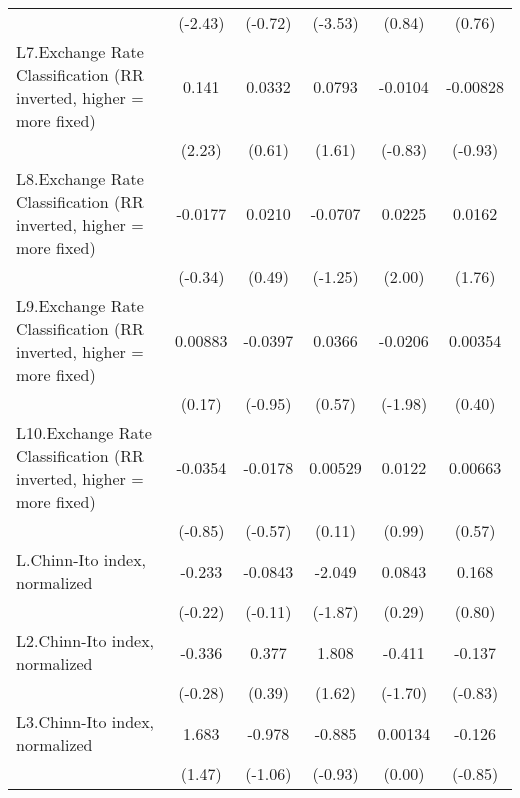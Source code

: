 {\begin{longtable}{l*{5}{c}}
                &  (-2.43)         &  (-0.72)         &  (-3.53)         &   (0.84)         &   (0.76)         \\
[1em]
L7.Exchange Rate Classification (RR inverted, higher = more fixed)&    0.141\sym{*}  &   0.0332         &   0.0793         &  -0.0104         & -0.00828         \\
                &   (2.23)         &   (0.61)         &   (1.61)         &  (-0.83)         &  (-0.93)         \\
[1em]
L8.Exchange Rate Classification (RR inverted, higher = more fixed)&  -0.0177         &   0.0210         &  -0.0707         &   0.0225\sym{*}  &   0.0162         \\
                &  (-0.34)         &   (0.49)         &  (-1.25)         &   (2.00)         &   (1.76)         \\
[1em]
L9.Exchange Rate Classification (RR inverted, higher = more fixed)&  0.00883         &  -0.0397         &   0.0366         &  -0.0206\sym{*}  &  0.00354         \\
                &   (0.17)         &  (-0.95)         &   (0.57)         &  (-1.98)         &   (0.40)         \\
[1em]
L10.Exchange Rate Classification (RR inverted, higher = more fixed)&  -0.0354         &  -0.0178         &  0.00529         &   0.0122         &  0.00663         \\
                &  (-0.85)         &  (-0.57)         &   (0.11)         &   (0.99)         &   (0.57)         \\
[1em]
L.Chinn-Ito index, normalized&   -0.233         &  -0.0843         &   -2.049         &   0.0843         &    0.168         \\
                &  (-0.22)         &  (-0.11)         &  (-1.87)         &   (0.29)         &   (0.80)         \\
[1em]
L2.Chinn-Ito index, normalized&   -0.336         &    0.377         &    1.808         &   -0.411         &   -0.137         \\
                &  (-0.28)         &   (0.39)         &   (1.62)         &  (-1.70)         &  (-0.83)         \\
[1em]
L3.Chinn-Ito index, normalized&    1.683         &   -0.978         &   -0.885         &  0.00134         &   -0.126         \\
                &   (1.47)         &  (-1.06)         &  (-0.93)         &   (0.00)         &  (-0.85)         \\
[1em]

\end{longtable}}
